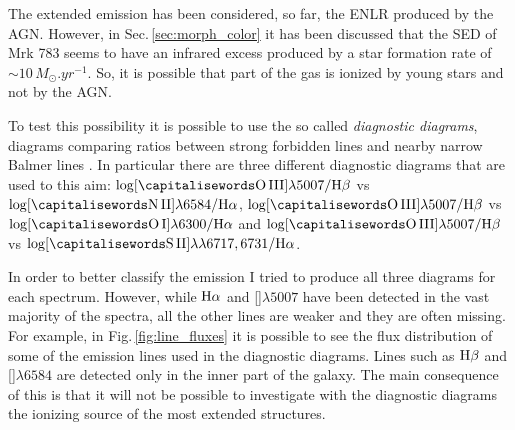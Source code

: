 \documentclass[../thesis.tex]{subfiles}
\begin{document}
The extended emission has been considered, so far, the ENLR produced by the AGN.
However, in Sec.\,\ref{sec:morph_color} it has been discussed that the SED of Mrk 783 seems to have an infrared excess produced by a star formation rate of $\sim 10\,\si{M_{\odot}.yr^{-1}}$.
So, it is possible that part of the gas is ionized by young stars and not by the AGN.

To test this possibility it is possible to use the so called \emph{diagnostic diagrams}, diagrams comparing ratios between strong forbidden lines and nearby narrow Balmer lines \citep{Baldwin81,Veilleux87}.
In particular there are three different diagnostic diagrams that are used to this aim: $\log [\rm \ion{O}{III}]\lambda5007/\Hb$ vs $\log [\rm \ion{N}{II}]\lambda6584/\Ha$, $\log [\rm \ion{O}{III}]\lambda5007/\Hb$ vs $\log [\rm \ion{O}{I}]\lambda6300/\Ha$ and $\log [\rm \ion{O}{III}]\lambda5007/\Hb$ vs $\log [\rm \ion{S}{II}]\lambda\lambda6717,6731/\Ha$.

In order to better classify the emission I tried to produce all three diagrams for each spectrum.
However, while $\rm H\alpha$ and []$\lambda5007$ have been detected in the vast majority of the spectra, all the other lines are weaker and they are often missing.
For example, in Fig.\,\ref{fig:line_fluxes} it is possible to see the flux distribution of some of the emission lines used in the diagnostic diagrams.
Lines such as $\rm H\beta$ and []$\lambda6584$ are detected only in the inner part of the galaxy.
The main consequence of this is that it will not be possible to investigate with the diagnostic diagrams the ionizing source of the most extended structures.
\end{document}
